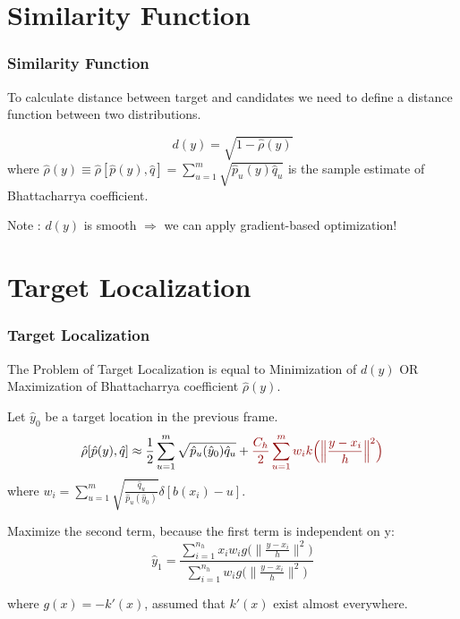 \documentclass[hyperref={pdfpagelabels=false}]{beamer}
\begin{document}

\section{Similarity Function}
\begin{frame}
\frametitle{Similarity Function}
To calculate distance between target and candidates we need to define {\color{darkred} a distance function between two distributions}.

	$$d(y) = \sqrt{1-\hat{\rho}(y)}$$
where $\hat{\rho}(y) \equiv \hat{\rho}[\hat{p}(y), \hat{q}] = \sum_{u=1}^{m}\sqrt{\hat{p}_u(y) \hat{q}_u}$ is the sample estimate of {\color{darkred} Bhattacharrya coefficient}.


\vspace{10pt}
{\color{darkred} Note} : $d(y)$ is smooth $\Rightarrow$ we can apply  gradient-based optimization!

\end{frame}


\section{Target Localization}
\begin{frame}
\frametitle{Target Localization}
\small
The Problem of Target Localization is equal to {\color{darkred} Minimization of $d(y)$} OR {\color{darkred} Maximization of Bhattacharrya coefficient} $\hat{\rho}(y)$.

\vspace{5pt}
Let $\hat{y}_0$ be a target location in the previous frame. 
$$\hat{\rho}[\hat{p}(y), \hat{q}] \approx \frac{1}{2}\sum_{u=1}^{m}\sqrt{\hat{p}_u(\hat{y}_0) \hat{q}_u}+\color{darkred}\frac{C_h}{2}\sum_{u=1}^{m}w_i k\Big(\Big\lVert\frac{ y-x_i}{h}\Big\rVert^2\Big)$$
where $w_i = \sum_{u=1}^{m}\sqrt{\frac{\hat{q}_u}{\hat{p}_u(\hat{y}_0)}}\delta[b(x_i)-u]$.

Maximize the second term, because the first term is independent on y:
$$\hat{y}_1 = \frac{\sum_{i=1}^{n_h}x_iw_ig\Big(\Big\lVert\frac{ y-x_i}{h}\Big\rVert^2\Big)}{\sum_{i=1}^{n_h}w_ig\Big(\Big\lVert\frac{ y-x_i}{h}\Big\rVert^2\Big)}$$

where $g(x) = -k'(x)$, assumed that $k'(x)$ exist almost everywhere.

\end{frame}
\end{document}
